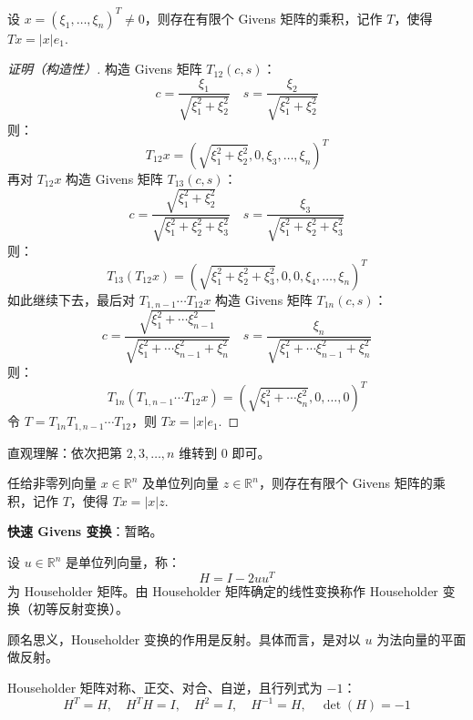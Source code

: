 \begin{theorem}
设 $x=(\xi_1,\ldots,\xi_n)^T\neq0$，则存在有限个 Givens 矩阵的乘积，记作 $T$，使得 $Tx=|x|e_1$.
\end{theorem}
\begin{proof}[证明（构造性）]
构造 Givens 矩阵 $T_{12}(c,s)$：
\[
    c=\frac{\xi_1}{\sqrt{\xi_1^2+\xi_2^2}}\quad s=\frac{\xi_2}{\sqrt{\xi_1^2+\xi_2^2}}
\]
则：
\[
    T_{12}x=\left(\sqrt{\xi_1^2+\xi_2^2},0,\xi_3,\ldots,\xi_n\right)^T
\]
再对 $T_{12}x$ 构造 Givens 矩阵 $T_{13}(c,s)$：
\[
    c=\frac{\sqrt{\xi_1^2+\xi_2^2}}{\sqrt{\xi_1^2+\xi_2^2+\xi_3^2}}\quad s=\frac{\xi_3}{\sqrt{\xi_1^2+\xi_2^2+\xi_3^2}}
\]
则：
\[
    T_{13}(T_{12}x)=\left(\sqrt{\xi_1^2+\xi_2^2+\xi_3^2},0,0,\xi_4,\ldots,\xi_n\right)^T
\]
如此继续下去，最后对 $T_{1,n-1}\cdots T_{12}x$ 构造 Givens 矩阵 $T_{1n}(c,s)$：
\[
    c=\frac{\sqrt{\xi_1^2+\cdots\xi_{n-1}^2}}{\sqrt{\xi_1^2+\cdots\xi_{n-1}^2+\xi_n^2}}\quad s=\frac{\xi_n}{\sqrt{\xi_1^2+\cdots\xi_{n-1}^2+\xi_n^2}}
\]
则：
\[
    T_{1n}(T_{1,n-1}\cdots T_{12}x)=\left(\sqrt{\xi_1^2+\cdots\xi_n^2},0,\ldots,0\right)^T
\]
令 $T=T_{1n}T_{1,n-1}\cdots T_{12}$，则 $Tx=|x|e_1$.
\end{proof}
\begin{remark}
直观理解：依次把第 $2,3,\ldots,n$ 维转到 0 即可。
\end{remark}

\begin{corollary}
任给非零列向量 $x\in\mathbb R^n$ 及单位列向量 $z\in\mathbb R^n$，则存在有限个 Givens 矩阵的乘积，记作 $T$，使得 $Tx=|x|z$.
\end{corollary}

\noindent\textbf{快速 Givens 变换}：暂略。

\begin{definition}
设 $u\in\mathbb R^n$ 是单位列向量，称：
\[
    H=I-2uu^T
\]
为 Householder 矩阵。由 Householder 矩阵确定的线性变换称作 Householder 变换（初等反射变换）。
\end{definition}

\begin{remark}
顾名思义，Householder 变换的作用是反射。具体而言，是对以 $u$ 为法向量的平面做反射。
\end{remark}

\begin{property}
Householder 矩阵对称、正交、对合、自逆，且行列式为 $-1$：
\[
    H^T=H,\quad H^TH=I,\quad H^2=I,\quad H^{-1}=H,\quad \det(H)=-1
\]
\end{property}

